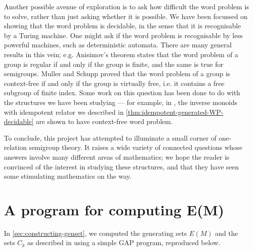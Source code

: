 \documentclass[noindex,noinsetproof,emphthm,12pt]{lmaths}
\begin{document}
Another possible avenue of exploration is to ask how difficult the word problem is to solve, rather than just asking whether it is possible. We have been focussed on showing that the word problem is decidable, in the sense that it is recognisable by a Turing machine. One might ask if the word problem is recognisable by less powerful machines, such as deterministic automata. There are many general results in this vein; e.g. Anisimov's theorem states that the word problem of a group is regular if and only if the group is finite, and the same is true for semigroups. Muller and Schupp proved that the word problem of a group is context-free if and only if the group is virtually free, i.e. it contains a free subgroup of finite index. Some work on this question has been done to do with the structures we have been studying --- for example, in \cite{Margolis1993}, the inverse monoids with idempotent relator we described in \cref{thm:idempotent-generated-WP-decidable} are shown to have context-free word problem.

To conclude, this project has attempted to illuminate a small corner of one-relation semigroup theory. It raises a wide variety of connected questions whose answers involve many different areas of mathematics; we hope the reader is convinced of the interest in studying these structures, and that they have seen some stimulating mathematics on the way.


\appendix
\section{A program for computing \texorpdfstring{E(M)}{$E(M)$}} \label{sec:E(M)-program}

In \cref{sec:constructing-genset}, we computed the generating sets $E(M)$ and the sets $C_k$ as described in \cite{Zhang1992a} using a simple GAP program, reproduced below.

\inputminted[linenos=true,mathescape,tabsize=2,breaklines]{gap}{../ors.g}
\clearpage

\printbibliography

\printindex
\end{document}
